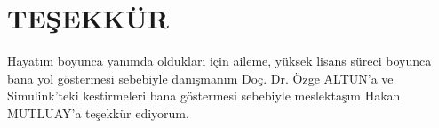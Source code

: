 \chapter{TEŞEKKÜR}

Hayatım boyunca yanımda oldukları için aileme, yüksek lisans süreci boyunca bana yol göstermesi sebebiyle danışmanım Doç. Dr. Özge ALTUN'a ve Simulink'teki kestirmeleri bana göstermesi sebebiyle meslektaşım
Hakan MUTLUAY'a teşekkür ediyorum.

